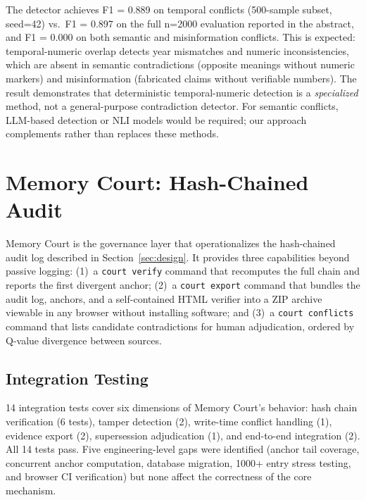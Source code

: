 \documentclass[11pt]{article}
\begin{document}
The detector achieves F1 = 0.889 on temporal conflicts (500-sample subset, seed=42) vs.\ F1 = 0.897 on the full n=2000 evaluation reported in the abstract, and F1 = 0.000 on both semantic and misinformation conflicts. This is expected: temporal-numeric overlap detects year mismatches and numeric inconsistencies, which are absent in semantic contradictions (opposite meanings without numeric markers) and misinformation (fabricated claims without verifiable numbers). The result demonstrates that deterministic temporal-numeric detection is a \emph{specialized} method, not a general-purpose contradiction detector. For semantic conflicts, LLM-based detection or NLI models would be required; our approach complements rather than replaces these methods.



\section{Memory Court: Hash-Chained Audit}
\label{sec:court}

Memory Court is the governance layer that operationalizes the hash-chained audit log described in Section~\ref{sec:design}. It provides three capabilities beyond passive logging: (1)~a \texttt{court verify} command that recomputes the full chain and reports the first divergent anchor; (2)~a \texttt{court export} command that bundles the audit log, anchors, and a self-contained HTML verifier into a ZIP archive viewable in any browser without installing software; and (3)~a \texttt{court conflicts} command that lists candidate contradictions for human adjudication, ordered by Q-value divergence between sources.

\subsection{Integration Testing}
14 integration tests cover six dimensions of Memory Court's behavior: hash chain verification (6 tests), tamper detection (2), write-time conflict handling (1), evidence export (2), supersession adjudication (1), and end-to-end integration (2). All 14 tests pass. Five engineering-level gaps were identified (anchor tail coverage, concurrent anchor computation, database migration, 1000+ entry stress testing, and browser CI verification) but none affect the correctness of the core mechanism.
\end{document}
